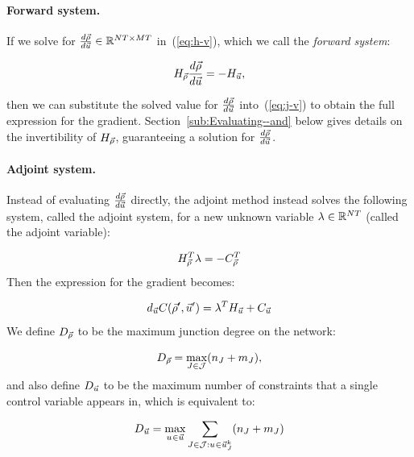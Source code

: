 \paragraph{Forward system.\label{par:Forward-system}}

If we solve for $\frac{d\vec{\rho}}{d\vec{u}}\in\mathbb{R}^{NT\times MT}$
in~(\ref{eq:h-v}), which we call the \emph{forward system}:

\[
H_{\vec{\rho}}\frac{d\vec{\rho}}{d\vec{u}}=-H_{\vec{u}},
\]


then we can substitute the solved value for $\frac{d\vec{\rho}}{d\vec{u}}$
into~(\ref{eq:j-v}) to obtain the full expression for the gradient.
Section~\ref{sub:Evaluating--and} below gives details on the invertibility
of $H_{\vec{\rho}}$, guaranteeing a solution for $\frac{d\vec{\rho}}{d\vec{u}}$.


\paragraph{Adjoint system.\label{par:Adjoint-system}}

Instead of evaluating $\frac{d\vec{\rho}}{d\vec{u}}$ directly, the adjoint
method instead solves the following system, called the adjoint system,
for a new unknown variable $\lambda\in\mathbb{R}^{NT}$
(called the adjoint variable):

\begin{equation}
H_{\vec{\rho}}^{T}\lambda=-C_{\vec{\rho}}^{T}\label{eq:adjoint}
\end{equation}
Then the expression for the gradient becomes:

\begin{equation}
d_{\control}\cost\left(\nominal{\state},\nominal{\control}\right)=\lambda^{T}\Hu+\Ju\label{eq:adjoint-grad}
\end{equation}
We define $D_{\vec{\rho}}$ to be the maximum junction degree on
the network:

\begin{equation}
\degree{\state}=\max_{\jn\in\jns}\left(\ninc_{\jn}+\nout_{\jn}\right),\label{eq:dx}
\end{equation}
and also define $D_{\vec{u}}$ to be the maximum number of constraints
that a single control variable appears in, which is equivalent to:

\begin{equation}
\degree{\control}=\max_{\condiscrete{}{}\in\control}\sum_{\jn\in\jns:\condiscrete{}{}\in\junccon{\jn}{\tind}}\left(\ninc_{\jn}+\nout_{\jn}\right)\label{eq:dv}
\end{equation}


